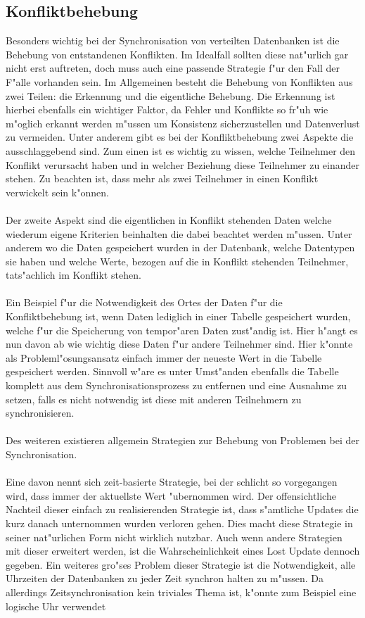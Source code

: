 \documentclass[a4paper,14pt]{scrreprt}
\begin{document}
\subsection{Konfliktbehebung}
Besonders wichtig bei der Synchronisation von verteilten Datenbanken ist die Behebung von entstandenen Konflikten. Im Idealfall sollten diese nat"urlich gar nicht erst auftreten, doch muss auch eine passende Strategie f"ur den Fall der F"alle vorhanden sein. Im Allgemeinen besteht die Behebung von Konflikten aus zwei Teilen: die Erkennung und die eigentliche Behebung. Die Erkennung ist hierbei ebenfalls ein wichtiger Faktor, da Fehler und Konflikte so fr"uh wie m"oglich erkannt werden m"ussen um Konsistenz sicherzustellen und Datenverlust zu vermeiden. Unter anderem gibt es bei der Konfliktbehebung zwei Aspekte die ausschlaggebend sind. Zum einen ist es wichtig zu wissen, welche Teilnehmer den Konflikt verursacht haben und in welcher Beziehung diese Teilnehmer zu einander stehen. Zu beachten ist, dass mehr als zwei Teilnehmer in einen Konflikt verwickelt sein k"onnen.\\\\Der zweite Aspekt sind die eigentlichen in Konflikt stehenden Daten welche wiederum eigene Kriterien beinhalten die dabei beachtet werden m"ussen. Unter anderem wo die Daten gespeichert wurden in der Datenbank, welche Datentypen sie haben und welche Werte, bezogen auf die in Konflikt stehenden Teilnehmer, tats"achlich im Konflikt stehen.\\\\Ein Beispiel f"ur die Notwendigkeit des Ortes der Daten f"ur die Konfliktbehebung ist, wenn Daten lediglich in einer Tabelle gespeichert wurden, welche f"ur die Speicherung von tempor"aren Daten zust"andig ist. Hier h"angt es nun davon ab wie wichtig diese Daten f"ur andere Teilnehmer sind. Hier k"onnte als Probleml"osungsansatz einfach immer der neueste Wert in die Tabelle gespeichert werden. Sinnvoll w"are es unter Umst"anden ebenfalls die Tabelle komplett aus dem Synchronisationsprozess zu entfernen und eine Ausnahme zu setzen, falls es nicht notwendig ist diese mit anderen Teilnehmern zu synchronisieren.\\\\Des weiteren existieren allgemein Strategien zur Behebung von Problemen bei der Synchronisation. \\\\Eine davon nennt sich zeit-basierte Strategie, bei der schlicht so vorgegangen wird, dass immer der aktuellste Wert "ubernommen wird. Der offensichtliche Nachteil dieser einfach zu realisierenden Strategie ist, dass s"amtliche Updates die kurz danach unternommen wurden verloren gehen. Dies macht diese Strategie in seiner nat"urlichen Form nicht wirklich nutzbar. Auch wenn andere Strategien mit dieser erweitert werden, ist die Wahrscheinlichkeit eines Lost Update dennoch gegeben. Ein weiteres gro"ses Problem dieser Strategie ist die Notwendigkeit, alle Uhrzeiten der Datenbanken zu jeder Zeit synchron halten zu m"ussen. Da allerdings Zeitsynchronisation kein triviales Thema ist, k"onnte zum Beispiel eine logische Uhr verwendet 
\end{document}
